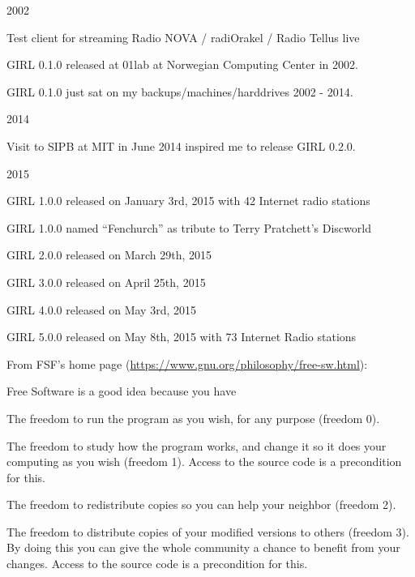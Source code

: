 \documentclass[20pt,landscape]{foils}
\begin{document}
\begin{list1}
\item 2002
  \begin{list2}
  \item Test client for streaming Radio NOVA / radiOrakel / Radio Tellus live
  \item GIRL 0.1.0 released at 01lab at Norwegian Computing Center in 2002.
  \item GIRL 0.1.0 just sat on my backups/machines/harddrives 2002 - 2014.
  \end{list2}
\item 2014
  \begin{list2}
  \item Visit to SIPB at MIT in June 2014 inspired me to release GIRL 0.2.0.
  \end{list2}
\item 2015
  \begin{list2}
    \item GIRL 1.0.0 released on January 3rd, 2015 with 42 Internet radio stations
    \item GIRL 1.0.0 named ``Fenchurch'' as tribute to Terry Pratchett's Discworld
    \item GIRL 2.0.0 released on March 29th, 2015
    \item GIRL 3.0.0 released on April 25th, 2015
    \item GIRL 4.0.0 released on May 3rd, 2015
    \item GIRL 5.0.0 released on May 8th, 2015 with 73 Internet Radio stations
  \end{list2}
\end{list1}


From FSF's home page (\url{https://www.gnu.org/philosophy/free-sw.html}):

\begin{list1}
\item Free Software is a good idea because you have
  \begin{list2}
    \item The freedom to run the program as you wish, for any purpose (freedom 0).
    \item The freedom to study how the program works, and change it so it does your computing as you wish (freedom 1). Access to the source code is a precondition for this.
    \item The freedom to redistribute copies so you can help your neighbor (freedom 2).
    \item The freedom to distribute copies of your modified versions to others (freedom 3). By doing this you can give the whole community a chance to benefit from your changes. Access to the source code is a precondition for this.
  \end{list2}
\end{list1}
\end{document}
